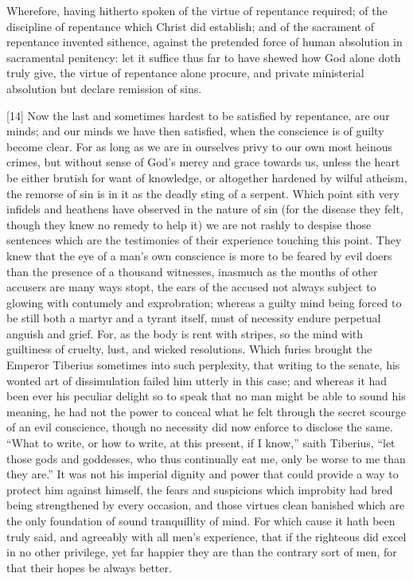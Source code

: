 Wherefore, having hitherto spoken of the virtue of repentance required; of the discipline of repentance which Christ did establish; and of the sacrament of repentance invented sithence, against the pretended force of human absolution in sacramental penitency: let it suffice thus far to have shewed how God alone doth truly give, the virtue of repentance alone procure, and private ministerial absolution but declare remission of sins.

[14] Now the last and sometimes hardest to be satisfied by repentance, are our minds; and our minds we have then satisfied, when the conscience is of guilty become clear. For as long as we are in ourselves privy to our own most heinous crimes, but without sense of God’s mercy and grace towards us, unless the heart be either brutish for want of knowledge, or altogether hardened by wilful atheism, the remorse of sin is in it as the deadly sting of a serpent. Which point sith very infidels and heathens have observed in the nature of sin (for the disease they felt, though they knew no remedy to help it) we are not rashly to despise those sentences which are the testimonies of their experience touching this point. They knew that the eye of a man’s own conscience is more to be feared by evil doers than the presence of a thousand witnesses, inasmuch as the mouths of other accusers are many ways stopt, the ears of the accused not always subject to glowing with contumely and exprobration; whereas a guilty mind being forced to be still both a martyr and a tyrant itself, must of necessity endure perpetual anguish and grief. For, as the body is rent with stripes, so the mind with guiltiness of cruelty, lust, and wicked resolutions. Which furies brought the Emperor Tiberius sometimes into such perplexity, that writing to the senate, his wonted art of dissimulation failed him utterly in this case; and whereas it had been ever his peculiar delight so to speak that no man might be able to sound his meaning, he had not  the power to conceal what he felt through the secret scourge of an evil conscience, though no necessity did now enforce to disclose the same. “What to write, or how to write, at this present, if I know,” saith Tiberius, “let those gods and goddesses, who thus continually eat me, only be worse to me than they are.” It was not his imperial dignity and power that could provide a way to protect him against himself, the fears and suspicions which improbity had bred being strengthened by every occasion, and those virtues clean banished which are the only foundation of sound tranquillity of mind. For which cause it hath been truly said, and agreeably with all men’s experience, that if the righteous did excel in no other privilege, yet far happier they are than the contrary sort of men, for that their hopes be always better.

